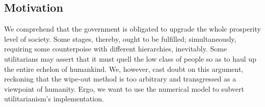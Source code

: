\documentclass[12pt]{article}
\begin{document}
\setlength{\columnsep}{0.03\textwidth}
\begin{multicols}{2}
    
\section{Motivation}
    We comprehend that the government is obligated to upgrade the whole prosperity level of society. Some stages, thereby, ought to be fulfilled; simultaneously, requiring some counterpoise with different hierarchies, inevitably. Some utilitarians may assert that it must quell the low class of people so as to haul up the entire echelon of humankind. We, however, cast doubt on this argument, reckoning that the wipe-out method is too arbitrary and transgressed as a viewpoint of humanity. Ergo, we want to use the numerical model to subvert utilitarianism's implementation.
    

\end{multicols}
\end{document}
